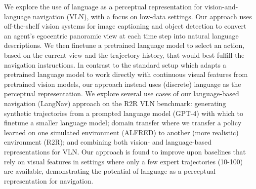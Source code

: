 We explore the use of language as a perceptual representation for vision-and-language navigation (VLN), with a focus on low-data settings. Our approach uses off-the-shelf vision systems  for image captioning and object detection to convert an  agent's egocentric panoramic view at each time step  into natural language descriptions. We then finetune a pretrained language model to select an action, based on the current view and the  trajectory history, that would best fulfill the navigation instructions. In contrast to the standard setup which adapts a pretrained language model to work directly with continuous visual features from pretrained vision models, our approach instead uses (discrete) language as the perceptual representation. We explore several use cases of our language-based navigation (LangNav) approach on the R2R VLN benchmark: generating synthetic trajectories from a prompted  language model (GPT-4) with which to finetune a smaller language model; domain transfer where we transfer a policy learned on one simulated environment (ALFRED) to another  (more realistic) environment (R2R); and combining both vision- and language-based representations for VLN. Our approach is found to improve upon  baselines that rely on visual features in settings where only a few expert trajectories (10-100) are available, demonstrating the potential of language as a perceptual representation for navigation.